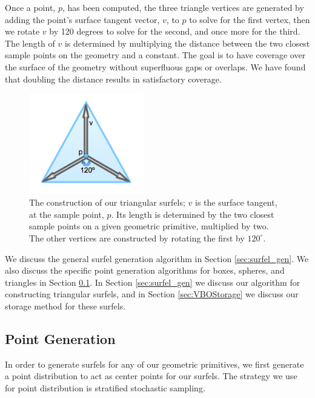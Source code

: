 Once a point, $p$, has been computed, the three triangle vertices are generated by adding the point's surface tangent vector, $v$, to $p$ to solve for the first vertex, then we rotate $v$ by 120 degrees to solve for the second, and once more for the third. The length of $v$ is determined by multiplying the distance between the two closest sample points on the geometry and a constant. The goal is to have coverage over the surface of the geometry without superfluous gaps or overlaps. We have found that doubling the distance results in satisfactory coverage.

\begin{figure}[h!]
   \centering
   \includegraphics[width=50mm]{../img/triangle_surfel_construction.png}
   \captionfonts
   \caption[Triangle surfel construction]{The construction of our triangular surfels; $v$ is the surface tangent, at the sample point, $p$. Its length is determined by the two closest sample points on a given geometric primitive, multiplied by two. The other vertices are constructed by rotating the first by $120^{\circ}$.}
   \label{fig:surfel_cloud_simple}
\end{figure}

We discuss the general surfel generation algorithm in Section \ref{sec:surfel_gen}. We also discuss the specific point generation algorithms for boxes, spheres, and triangles in Section \ref{sec:point_gen}. In Section \ref{sec:surfel_gen} we discuss our algorithm for constructing triangular surfels, and in Section \ref{sec:VBOStorage} we discuss our storage method for these surfels.

\subsection{Point Generation}
\label{sec:point_gen}

In order to generate surfels for any of our geometric primitives, we first generate a point distribution to act as center points for our surfels. The strategy we use for point distribution is stratified stochastic sampling.

